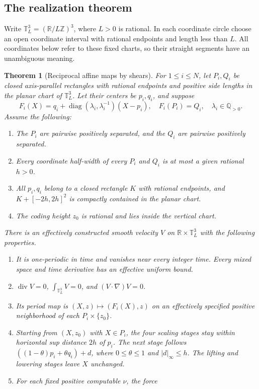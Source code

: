 \documentclass[11pt]{article}
\newtheorem{theorem}{Theorem}[section]
\theoremstyle{remark}
\newcommand{\T}{\mathbb T}
\newcommand{\R}{\mathbb R}
\newcommand{\Q}{\mathbb Q}
\newcommand{\diag}{\operatorname{diag}}
\newcommand{\divg}{\operatorname{div}}
\begin{document}
\subsection{The realization theorem}
Write $\T_L^3=(\R/L\mathbb Z)^3$, where $L>0$ is rational. In each
coordinate circle choose an open coordinate interval with rational
endpoints and length less than $L$. All coordinates below refer to these
fixed charts, so their straight segments have an unambiguous meaning.
\begin{theorem}[Reciprocal affine maps by shears]\label{thm:shears}
For $1\le i\le N$, let $P_i,Q_i$ be closed axis-parallel rectangles with
rational endpoints and positive side lengths in the planar chart of
$\T_L^3$. Let their centers be $p_i,q_i$, and suppose
\[
 F_i(X)=q_i+\diag(\lambda_i,\lambda_i^{-1})(X-p_i),
 \quad F_i(P_i)=Q_i,
 \quad\lambda_i\in\Q_{>0}.
\]
Assume the following:
\begin{enumerate}[label=(\roman*),nosep]
\item The $P_i$ are pairwise positively separated, and the $Q_i$ are
pairwise positively separated.
\item Every coordinate half-width of every $P_i$ and $Q_i$ is at most a
given rational $h>0$.
\item All $p_i,q_i$ belong to a closed rectangle $K$ with rational
endpoints, and $K+[-2h,2h]^2$ is compactly contained in the planar chart.
\item The coding height $z_0$ is rational and lies inside the vertical chart.
\end{enumerate}
There is an effectively constructed smooth velocity $V$ on
$\R\times\T_L^3$ with the following properties.
\begin{enumerate}[label=(\alph*),itemsep=2pt]
\item It is one-periodic in time and vanishes near every integer time.
Every mixed space and time derivative has an effective uniform bound.
\item $\divg V=0$, $\int_{\T_L^3}V=0$, and $(V\cdot\nabla)V=0$.
\item Its period map is $(X,z)\mapsto(F_i(X),z)$ on an effectively
specified positive neighborhood of each $P_i\times\{z_0\}$.
\item Starting from $(X,z_0)$ with $X\in P_i$, the four scaling stages
stay within horizontal sup distance $2h$ of $p_i$. The next stage follows
$((1-\theta)p_i+\theta q_i)+d$, where $0\le\theta\le1$ and
$|d|_\infty\le h$. The lifting and lowering stages leave $X$ unchanged.
\item For each fixed positive computable $\nu$, the force

\end{enumerate}
\end{theorem}
\end{document}
